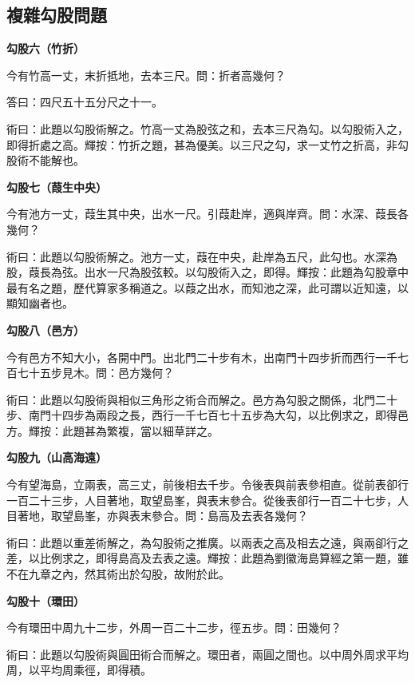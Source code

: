 \documentclass[11pt,a4paper]{article}
\newenvironment{problemenv}[1]{%
  \medskip\noindent\textbf{#1}\par\nopagebreak\smallskip
}{\medskip}
\begin{document}
\subsection{複雜勾股問題}

\begin{problemenv}{勾股六（竹折）}
今有竹高一丈，末折抵地，去本三尺。問：折者高幾何？

\textsf{答曰：}四尺五十五分尺之十一。

\textsf{術曰：}此題以勾股術解之。竹高一丈為股弦之和，去本三尺為勾。以勾股術入之，即得折處之高。輝按：竹折之題，甚為優美。以三尺之勾，求一丈竹之折高，非勾股術不能解也。
\end{problemenv}

\begin{problemenv}{勾股七（葭生中央）}
今有池方一丈，葭生其中央，出水一尺。引葭赴岸，適與岸齊。問：水深、葭長各幾何？

\textsf{術曰：}此題以勾股術解之。池方一丈，葭在中央，赴岸為五尺，此勾也。水深為股，葭長為弦。出水一尺為股弦較。以勾股術入之，即得。輝按：此題為勾股章中最有名之題，歷代算家多稱道之。以葭之出水，而知池之深，此可謂以近知遠，以顯知幽者也。
\end{problemenv}

\begin{problemenv}{勾股八（邑方）}
今有邑方不知大小，各開中門。出北門二十步有木，出南門十四步折而西行一千七百七十五步見木。問：邑方幾何？

\textsf{術曰：}此題以勾股術與相似三角形之術合而解之。邑方為勾股之關係，北門二十步、南門十四步為兩段之長，西行一千七百七十五步為大勾，以比例求之，即得邑方。輝按：此題甚為繁複，當以細草詳之。
\end{problemenv}

\begin{problemenv}{勾股九（山高海遠）}
今有望海島，立兩表，高三丈，前後相去千步。令後表與前表參相直。從前表卻行一百二十三步，人目著地，取望島峯，與表末參合。從後表卻行一百二十七步，人目著地，取望島峯，亦與表末參合。問：島高及去表各幾何？

\textsf{術曰：}此題以重差術解之，為勾股術之推廣。以兩表之高及相去之遠，與兩卻行之差，以比例求之，即得島高及去表之遠。輝按：此題為劉徽海島算經之第一題，雖不在九章之內，然其術出於勾股，故附於此。
\end{problemenv}

\begin{problemenv}{勾股十（環田）}
今有環田中周九十二步，外周一百二十二步，徑五步。問：田幾何？

\textsf{術曰：}此題以勾股術與圓田術合而解之。環田者，兩圓之間也。以中周外周求平均周，以平均周乘徑，即得積。
\end{problemenv}
\end{document}
